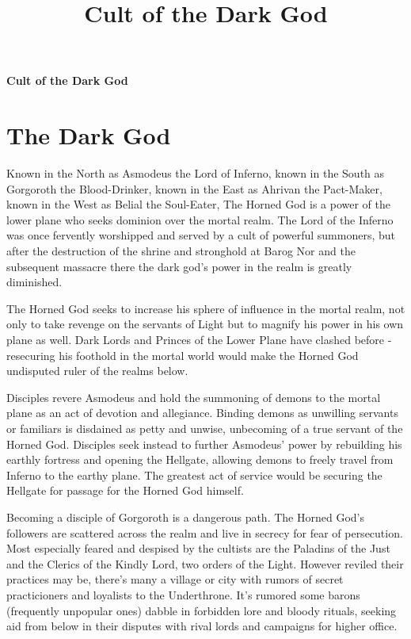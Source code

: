 \documentclass[12pt]{article}
\title{Cult of the Dark God}
\begin{document}
\thispagestyle{empty}
\begin{center}
\textbf{\Large Cult of the Dark God}\\

\end{center}


\section{The Dark God}

Known in the North as Asmodeus the Lord of Inferno, known in the South as
Gorgoroth the Blood-Drinker, known in the East as Ahrivan the Pact-Maker, known
in the West as Belial the Soul-Eater, The Horned God is a power of the lower
plane who seeks dominion over the mortal realm. The Lord of the Inferno was
once fervently worshipped and served by a cult of powerful summoners, but after
the destruction of the shrine and stronghold at Barog Nor and the subsequent
massacre there the dark god's power in the realm is greatly diminished.

The Horned God seeks to increase his sphere of influence in the mortal realm,
not only to take revenge on the servants of Light but to magnify his power in
his own plane as well. Dark Lords and Princes of the Lower Plane have clashed
before - resecuring his foothold in the mortal world would make the Horned God
undisputed ruler of the realms below.

Disciples revere Asmodeus and hold the summoning of demons to the mortal plane
as an act of devotion and allegiance. Binding demons as unwilling servants or
familiars is disdained as petty and unwise, unbecoming of a true servant of the
Horned God. Disciples seek instead to further Asmodeus' power by rebuilding his
earthly fortress and opening the Hellgate, allowing demons to freely travel
from Inferno to the earthy plane. The greatest act of service would be securing
the Hellgate for passage for the Horned God himself.

Becoming a disciple of Gorgoroth is a dangerous path. The Horned God's
followers are scattered across the realm and live in secrecy for fear of
persecution. Most especially feared and despised by the cultists are the
Paladins of  the Just and the Clerics of the Kindly Lord, two orders of the
Light. However reviled their practices may be, there's many a village or city
with rumors of secret practicioners and loyalists to the Underthrone. It's
rumored some barons (frequently unpopular ones) dabble in forbidden lore and
bloody rituals, seeking aid from below in their disputes with rival lords and
campaigns for higher office.
\end{document}

